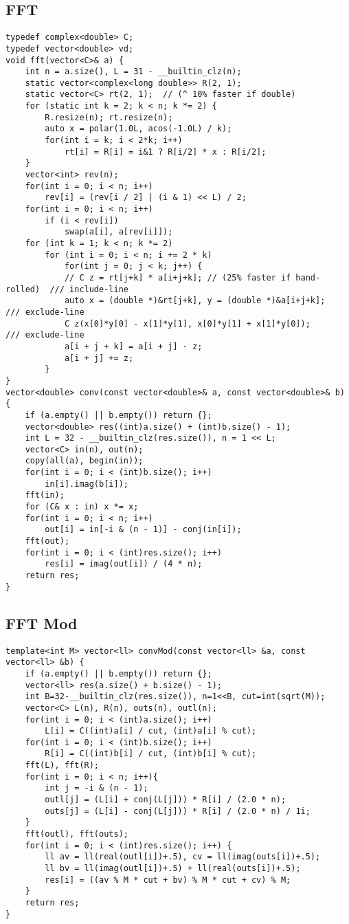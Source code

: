 \documentclass[landscape, 8pt, a4paper, oneside]{extarticle}
\begin{document}
\begin{multicols}{3}
\subsection{FFT}
\begin{verbatim}
typedef complex<double> C;
typedef vector<double> vd;
void fft(vector<C>& a) {
	int n = a.size(), L = 31 - __builtin_clz(n);
	static vector<complex<long double>> R(2, 1);
	static vector<C> rt(2, 1);  // (^ 10% faster if double)
	for (static int k = 2; k < n; k *= 2) {
		R.resize(n); rt.resize(n);
		auto x = polar(1.0L, acos(-1.0L) / k);
		for(int i = k; i < 2*k; i++)
			rt[i] = R[i] = i&1 ? R[i/2] * x : R[i/2];
	}
	vector<int> rev(n);
	for(int i = 0; i < n; i++)
		rev[i] = (rev[i / 2] | (i & 1) << L) / 2;
	for(int i = 0; i < n; i++)
		if (i < rev[i])
			swap(a[i], a[rev[i]]);
	for (int k = 1; k < n; k *= 2)
		for (int i = 0; i < n; i += 2 * k)
			for(int j = 0; j < k; j++) {
			// C z = rt[j+k] * a[i+j+k]; // (25% faster if hand-rolled)  /// include-line
			auto x = (double *)&rt[j+k], y = (double *)&a[i+j+k];        /// exclude-line
			C z(x[0]*y[0] - x[1]*y[1], x[0]*y[1] + x[1]*y[0]);           /// exclude-line
			a[i + j + k] = a[i + j] - z;
			a[i + j] += z;
		}
}
vector<double> conv(const vector<double>& a, const vector<double>& b) {
	if (a.empty() || b.empty()) return {};
	vector<double> res((int)a.size() + (int)b.size() - 1);
	int L = 32 - __builtin_clz(res.size()), n = 1 << L;
	vector<C> in(n), out(n);
	copy(all(a), begin(in));
	for(int i = 0; i < (int)b.size(); i++)
		in[i].imag(b[i]);
	fft(in);
	for (C& x : in) x *= x;
	for(int i = 0; i < n; i++)
		out[i] = in[-i & (n - 1)] - conj(in[i]);
	fft(out);
	for(int i = 0; i < (int)res.size(); i++)
		res[i] = imag(out[i]) / (4 * n);
	return res;
}
\end{verbatim}
\subsection{FFT Mod}
\begin{verbatim}
template<int M> vector<ll> convMod(const vector<ll> &a, const vector<ll> &b) {
	if (a.empty() || b.empty()) return {};
	vector<ll> res(a.size() + b.size() - 1);
	int B=32-__builtin_clz(res.size()), n=1<<B, cut=int(sqrt(M));
	vector<C> L(n), R(n), outs(n), outl(n);
	for(int i = 0; i < (int)a.size(); i++)
		L[i] = C((int)a[i] / cut, (int)a[i] % cut);
	for(int i = 0; i < (int)b.size(); i++)
		R[i] = C((int)b[i] / cut, (int)b[i] % cut);
	fft(L), fft(R);
	for(int i = 0; i < n; i++){
		int j = -i & (n - 1);
		outl[j] = (L[i] + conj(L[j])) * R[i] / (2.0 * n);
		outs[j] = (L[i] - conj(L[j])) * R[i] / (2.0 * n) / 1i;
	}
	fft(outl), fft(outs);
	for(int i = 0; i < (int)res.size(); i++) {
		ll av = ll(real(outl[i])+.5), cv = ll(imag(outs[i])+.5);
		ll bv = ll(imag(outl[i])+.5) + ll(real(outs[i])+.5);
		res[i] = ((av % M * cut + bv) % M * cut + cv) % M;
	}
	return res;
}
\end{verbatim}

\end{multicols}
\end{document}
